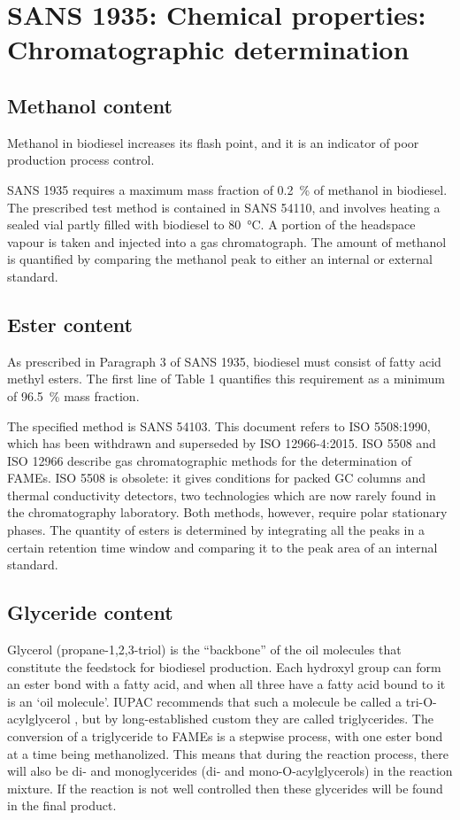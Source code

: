 \section{SANS 1935: Chemical properties: Chromatographic determination}
\label{sec:ChromDet}

\subsection{Methanol content}

Methanol in biodiesel increases its flash point, and it is an indicator of poor
production process control.

SANS 1935 requires a maximum mass fraction of \SI{0.2}{\percent} of methanol in
biodiesel. The prescribed test method is contained in SANS 54110, and involves
heating a sealed vial partly filled with biodiesel to \SI{80}{\celsius}. A
portion of the headspace vapour is taken and injected into a gas chromatograph.
The amount of methanol is quantified by comparing the methanol peak to either an
internal or external standard.

\subsection{Ester content}
\label{sec:EsterContent}
As prescribed in Paragraph 3 of SANS 1935, biodiesel must consist of fatty acid
methyl esters. The first line of Table 1 quantifies this requirement as a
minimum of \SI{96.5}{\percent} mass fraction. 

The specified method is SANS 54103. This document refers to ISO 5508:1990, which
has been withdrawn and superseded by ISO 12966-4:2015. ISO 5508 and ISO 12966
describe gas chromatographic methods for the determination of FAMEs. ISO 5508 is
obsolete: it gives conditions for packed GC columns and thermal conductivity
detectors, two technologies which are now rarely found in the chromatography
laboratory. Both methods, however, require polar stationary phases. The quantity of
esters is determined by integrating all the peaks in a certain retention time
window and comparing it to the peak area of an internal standard.

\subsection{Glyceride content}
\label{sec:Glycerides}

Glycerol (propane-1,2,3-triol) is the ``backbone'' of the oil molecules that
constitute the feedstock for biodiesel production. Each hydroxyl group can form
an ester bond with a fatty acid, and when all three have a fatty acid bound to
it is an `oil molecule'. IUPAC recommends that such a molecule be called a
tri-O-acylglycerol \autocite{Nic2009}, but by long-established custom they are
called triglycerides. The conversion of a triglyceride to FAMEs is a stepwise
process, with one ester bond at a time being methanolized. This means that
during the reaction process, there will also be di- and monoglycerides (di- and
mono-O-acylglycerols) in the reaction mixture. If the reaction is not well
controlled then these glycerides will be found in the final product.

